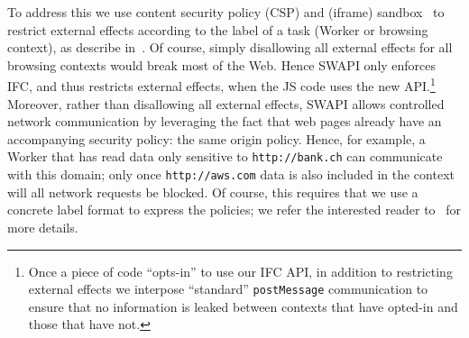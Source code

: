 To address this we use content security policy (CSP) and (iframe)
sandbox~\tocite{} to restrict external effects according to the label
of a task (Worker or browsing context), as describe
in~\tocite{}.
%
Of course, simply disallowing all external effects for all browsing
contexts would break most of the Web.
%
Hence SWAPI only enforces IFC, and thus restricts external effects,
when the JS code uses the new API.\footnote{
  Once a piece of code ``opts-in'' to use our IFC API, in addition to
  restricting external effects we interpose ``standard''
  \texttt{postMessage} communication to ensure that no information is
  leaked between contexts that have opted-in and those that have not.
}
%
Moreover, rather than disallowing all external effects, SWAPI allows
controlled network communication by leveraging the fact that web
pages already have an accompanying security policy: the same origin
policy.
%
Hence, for example, a Worker that has read data only sensitive to
\texttt{http://bank.ch} can communicate with this domain; only once
\texttt{http://aws.com} data is also included in the context will all
network requests be blocked.
%
Of course, this requires that we use a concrete label format to
express the policies; we refer the interested reader to~\tocite{} for
more details.
